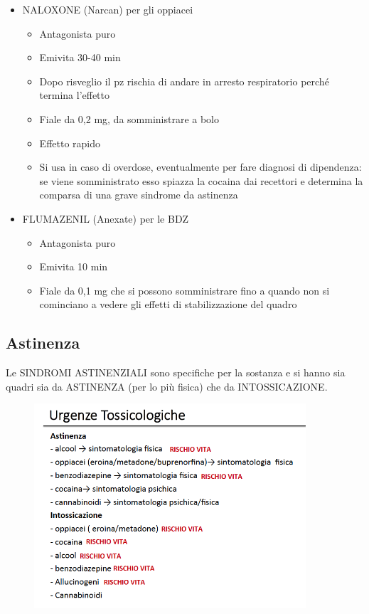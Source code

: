 \begin{itemize}
\item
  NALOXONE (Narcan) per gli oppiacei
  \begin{itemize}
  \item
    Antagonista puro
  \item
    Emivita 30-40 min
  \item
    Dopo risveglio il pz rischia di andare in arresto respiratorio
    perché termina l'effetto
  \item
    Fiale da 0,2 mg, da somministrare a bolo
  \item
    Effetto rapido
  \item
    Si usa in caso di overdose, eventualmente per fare diagnosi di
    dipendenza: se viene somministrato esso spiazza la cocaina dai
    recettori e determina la comparsa di una grave sindrome da astinenza
  \end{itemize}
\item
  FLUMAZENIL (Anexate) per le BDZ
  \begin{itemize}
  \item
    Antagonista puro
  \item
    Emivita 10 min
  \item
    Fiale da 0,1 mg che si possono somministrare fino a quando non si cominciano a vedere gli effetti di stabilizzazione del quadro
  \end{itemize}
\end{itemize}

\subsection{Astinenza}

Le SINDROMI ASTINENZIALI sono specifiche per la sostanza e si hanno sia
quadri sia da ASTINENZA (per lo più fisica) che da INTOSSICAZIONE.

\begin{figure}[!ht]
\centering
	\includegraphics[width=0.9\textwidth]{017/image9.png}
\end{figure}

